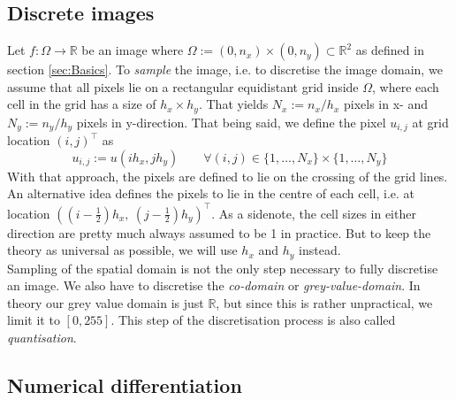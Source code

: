 \subsection{Discrete images}
Let $f:\Omega \rightarrow \mathbb{R}$ be an image where $\Omega
:= (0, n_x)\times(0, n_y) \subset \mathbb{R}^2$ as defined in section \ref{sec:Basics}. To
\textit{sample} the image, i.e. to discretise the image domain, we assume that all pixels lie on a
rectangular equidistant grid inside $\Omega$, where each cell in the grid has a size of $h_x
\times h_y$.
That yields $N_x := n_x/h_x$ pixels in x- and $N_y := n_y/h_y$ pixels in
y-direction.
That being said, we define the pixel $u_{i,j}$ at grid location $(i, j)^\top$ as
\begin{equation}
    u_{i, j} := u(ih_x, jh_y)\qquad \forall(i ,j) \in \{1,\dots,N_x\}\times\{1,\dots,N_y\}
\end{equation}
With that approach, the pixels are defined to lie on the crossing of the grid lines.
An alternative idea defines the pixels to lie in the centre of each cell, i.e. at location 
$((i-\frac{1}{2})h_x,\ (j- \frac{1}{2})h_y)^\top$.
As a sidenote, the cell sizes in either direction are pretty much always assumed to be 1 in 
practice. 
But to keep the theory as universal as possible, we will use $h_x$ and $h_y$ instead.\\
Sampling of the spatial domain is not the only step necessary to fully discretise an image. We also have
to discretise the \textit{co-domain} or \textit{grey-value-domain}. In theory our grey value domain
is just $\mathbb{R}$, but since this is rather unpractical, we limit it to $[0, 255]$. This step of
the discretisation process is also called \textit{quantisation}.

\subsection{Numerical differentiation}

